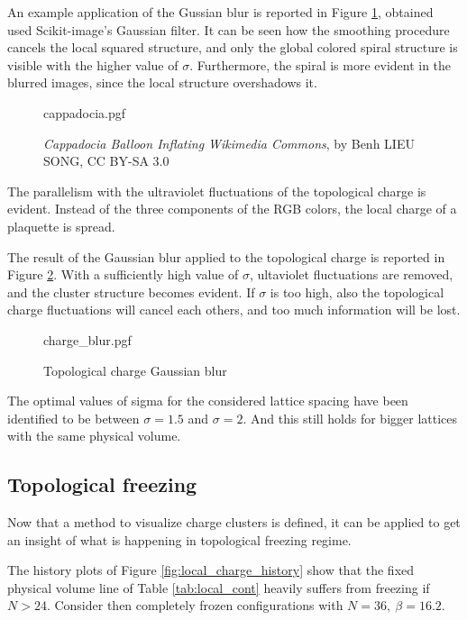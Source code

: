 An example application of the Gussian blur is reported in Figure \ref{fig:cappadocia}, obtained used Scikit-image's Gaussian filter.
It can be seen how the smoothing procedure cancels the local squared structure,
and only the global colored spiral structure is visible with the higher value of $\sigma$.
Furthermore, the spiral is more evident in the blurred images, since the local structure overshadows it.

\begin{figure}[!htb]
    \centering
    {cappadocia.pgf}
    \caption{\emph{Cappadocia Balloon Inflating Wikimedia Commons}, by Benh LIEU SONG, CC BY-SA 3.0}
    \label{fig:cappadocia}
\end{figure}

The parallelism with the ultraviolet fluctuations of the topological charge is evident.
Instead of the three components of the RGB colors, the local charge of a plaquette is spread.

The result of the Gaussian blur applied to the topological charge is reported in Figure \ref{fig:charge_blur}.
With a sufficiently high value of $\sigma$, ultaviolet fluctuations are removed,
and the cluster structure becomes evident.
If $\sigma$ is too high, also the topological charge fluctuations will cancel each others,
and too much information will be lost.

\begin{figure}[!htb]
    \centering
    {charge_blur.pgf}
    \caption{Topological charge Gaussian blur}
    \label{fig:charge_blur}
\end{figure}

The optimal values of sigma for the considered lattice spacing have been identified to be between $\sigma=1.5$ and $\sigma=2$.
And this still holds for bigger lattices with the same physical volume.

\subsection*{Topological freezing}
Now that a method to visualize charge clusters is defined,
it can be applied to get an insight of what is happening in topological freezing regime.

The history plots of Figure \ref{fig:local_charge_history} show that the fixed physical volume line of Table \ref{tab:local_cont}
heavily suffers from freezing if $N>24$.
Consider then completely frozen configurations with $N=36,\ \beta=16.2$.

